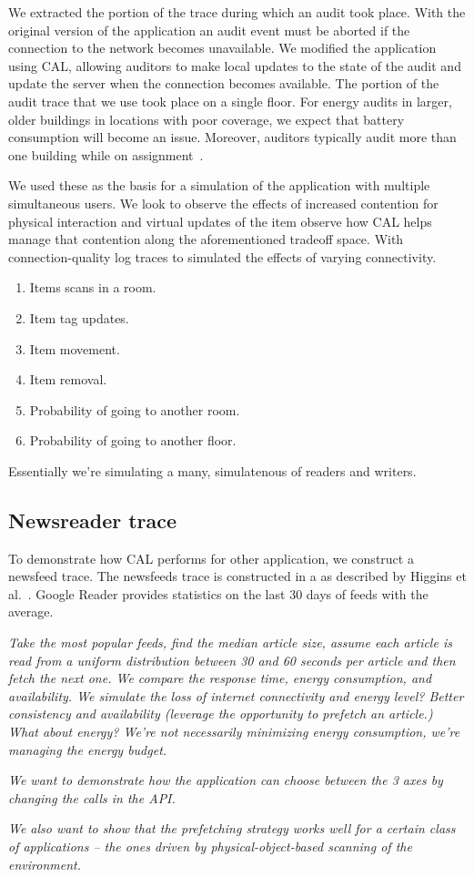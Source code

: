 We extracted the portion of the trace during which an audit took place.  With the original version of the application
an audit event must be aborted if the connection to the network becomes unavailable.  We modified the application using CAL,
allowing auditors to make local updates to the state of the audit and update the server when the connection becomes 
available.  The portion of the audit trace that we use took place on a single floor.  For energy audits in larger, older buildings
in locations with poor coverage, we expect that battery consumption will become an issue.  Moreover, auditors
 typically audit more than one building while on assignment~\cite{somethingHere}.

We used these as the basis for a simulation of the application with multiple simultaneous users.  We look to observe the 
effects of increased contention for physical interaction and virtual updates of the item
observe how CAL helps manage that contention along the aforementioned tradeoff space.  With connection-quality log traces
to simulated the effects of varying connectivity.

\begin{enumerate}
\item Items scans in a room.
\item Item tag updates.
\item Item movement.
\item Item removal.
\item Probability of going to another room.
\item Probability of going to another floor.
\end{enumerate}

Essentially we're simulating a many, simulatenous of readers and writers.

\subsection{Newsreader trace}
To demonstrate how CAL performs for other application, we construct a newsfeed trace.  The newsfeeds trace is constructed in a
as described by Higgins et al.~\cite{imp_mobisys2012}.  Google Reader provides statistics on the last 30
days of feeds with the average.

\emph{Take the most popular feeds, find the median article size, assume each article is read from a uniform distribution between
30 and 60 seconds per article and then fetch the next one.  We compare the response time, energy consumption, and availability.
We simulate the loss of internet connectivity and energy level?  Better consistency and availability (leverage the opportunity 
to prefetch an article.)  What about energy?  We're not necessarily minimizing energy consumption, we're managing the energy budget.}

\emph{We want to demonstrate how the application can choose between the 3 axes by changing the calls in the API.  }

\emph{We also want to show that the prefetching strategy works well for a certain class of applications -- the ones driven by physical-object-based
scanning of the environment.}